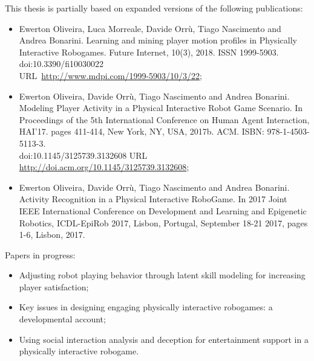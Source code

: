 This thesis is partially based on expanded versions of the following publications:

\begin{itemize}
    \item Ewerton Oliveira, Luca Morreale, Davide Orrù, Tiago Nascimento and Andrea Bonarini. Learning and mining player motion profiles in Physically Interactive Robogames. Future Internet, 10(3), 2018. ISSN 1999-5903. doi:10.3390/fi10030022\\ URL~\url{http://www.mdpi.com/1999-5903/10/3/22};
    \item Ewerton Oliveira, Davide Orrù, Tiago Nascimento and Andrea Bonarini. Modeling Player Activity  in a Physical Interactive Robot Game Scenario. In Proceedings of the 5th International Conference on Human Agent Interaction, HAI'17. pages 411-414, New York, NY, USA, 2017b. ACM. ISBN: 978-1-4503-5113-3. \\
    doi:10.1145/3125739.3132608 URL \url{http://doi.acm.org/10.1145/3125739.3132608};
    \item Ewerton Oliveira, Davide Orrù, Tiago Nascimento and Andrea Bonarini. Activity Recognition in a Physical Interactive RoboGame. In 2017 Joint IEEE International Conference on Development and Learning and Epigenetic Robotics, ICDL-EpiRob 2017, Lisbon, Portugal, September 18-21 2017, pages 1-6, Lisbon, 2017.
\end{itemize}

Papers in progress:

\begin{itemize}
\item Adjusting robot playing behavior through latent skill modeling for increasing player satisfaction;
\item Key issues in designing engaging physically interactive robogames: a developmental account;
\item Using social interaction analysis and deception for entertainment support in a physically interactive robogame.
\end{itemize}